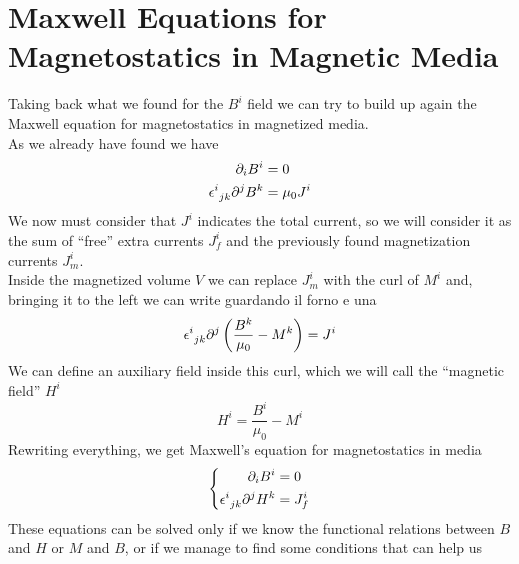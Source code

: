 \documentclass[../electromagnetism.tex]{subfiles}
\begin{document}
\section{Maxwell Equations for Magnetostatics in Magnetic Media}
Taking back what we found for the $B^i$ field we can try to build up again the Maxwell equation for magnetostatics in magnetized media.\\
As we already have found we have
\begin{equation*}
	\begin{aligned}
		\partial_iB^i&=0\\
		\epsilon^{i}_{\ jk}\partial^jB^k&=\mu_0J^i
	\end{aligned}
\end{equation*}
We now must consider that $J^i$ indicates the total current, so we will consider it as the sum of ``free'' extra currents $J^i_f$ and the previously found magnetization currents $J^i_m$.\\
Inside the magnetized volume $V$ we can replace $J^i_m$ with the curl of $M^i$ and, bringing it to the left we can write
guardando il forno e una \begin{equation*}
	\epsilon^{i}_{\ jk}\partial^j\left( \frac{B^k}{\mu_0}-M^k \right)=J^i
\end{equation*}
We can define an auxiliary field inside this curl, which we will call the ``magnetic field'' $H^i$
\begin{equation}
	H^i=\frac{B^i}{\mu_0}-M^i
	\label{eq:magfieldH}
\end{equation}
Rewriting everything, we get Maxwell's equation for magnetostatics in media
\begin{equation}
	\left\{ \begin{aligned}
		\partial_iB^i&=0\\
		\epsilon^{i}_{\ jk}\partial^jH^k&=J^i_f
\end{aligned}\right.
	\label{eq:mwmstaticH}
\end{equation}
These equations can be solved only if we know the functional relations between $B$ and $H$ or $M$ and $B$, or if we manage to find some conditions that can help us
\end{document}
